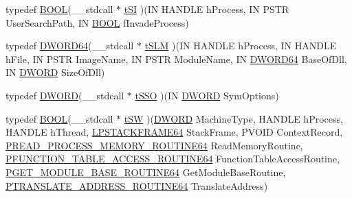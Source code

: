 \begin{DoxyCompactItemize}
\item 
typedef \hyperlink{class_stack_walker_internal_a1fc4c47aaad5ff92853793d0ef3146cd}{B\-O\-O\-L}(\-\_\-\-\_\-stdcall $\ast$ \hyperlink{class_stack_walker_internal_adc383ff1fa52e09c460c0ba4b8ba9a3b}{t\-S\-I} )(I\-N H\-A\-N\-D\-L\-E h\-Process, I\-N P\-S\-T\-R User\-Search\-Path, I\-N \hyperlink{class_stack_walker_internal_a1fc4c47aaad5ff92853793d0ef3146cd}{B\-O\-O\-L} f\-Invade\-Process)
\item 
typedef \hyperlink{_stack_walker_8h_a97fb241c597b99bcb965858f53cacac4}{D\-W\-O\-R\-D64}(\-\_\-\-\_\-stdcall $\ast$ \hyperlink{class_stack_walker_internal_a151d0d6060e9fbca922bbcf86502b466}{t\-S\-L\-M} )(I\-N H\-A\-N\-D\-L\-E h\-Process, I\-N H\-A\-N\-D\-L\-E h\-File, I\-N P\-S\-T\-R Image\-Name, I\-N P\-S\-T\-R Module\-Name, I\-N \hyperlink{_stack_walker_8h_a97fb241c597b99bcb965858f53cacac4}{D\-W\-O\-R\-D64} Base\-Of\-Dll, I\-N \hyperlink{class_stack_walker_internal_aa02cf07e5926c7dd20d31269185c52b0}{D\-W\-O\-R\-D} Size\-Of\-Dll)
\item 
typedef \hyperlink{class_stack_walker_internal_aa02cf07e5926c7dd20d31269185c52b0}{D\-W\-O\-R\-D}(\-\_\-\-\_\-stdcall $\ast$ \hyperlink{class_stack_walker_internal_ad5e78468cabdf8dea0f3b5bf02e23498}{t\-S\-S\-O} )(I\-N \hyperlink{class_stack_walker_internal_aa02cf07e5926c7dd20d31269185c52b0}{D\-W\-O\-R\-D} Sym\-Options)
\item 
typedef \hyperlink{class_stack_walker_internal_a1fc4c47aaad5ff92853793d0ef3146cd}{B\-O\-O\-L}(\-\_\-\-\_\-stdcall $\ast$ \hyperlink{class_stack_walker_internal_a23455d3c1a4ebe202187adca43bab297}{t\-S\-W} )(\hyperlink{class_stack_walker_internal_aa02cf07e5926c7dd20d31269185c52b0}{D\-W\-O\-R\-D} Machine\-Type, H\-A\-N\-D\-L\-E h\-Process, H\-A\-N\-D\-L\-E h\-Thread, \hyperlink{_stack_walker_8cpp_a1645fb6e1f8e09b5a9eac1b9d5cddaca}{L\-P\-S\-T\-A\-C\-K\-F\-R\-A\-M\-E64} Stack\-Frame, P\-V\-O\-I\-D Context\-Record, \hyperlink{_stack_walker_8cpp_a8d21bc6f316637942af2918298f765bd}{P\-R\-E\-A\-D\-\_\-\-P\-R\-O\-C\-E\-S\-S\-\_\-\-M\-E\-M\-O\-R\-Y\-\_\-\-R\-O\-U\-T\-I\-N\-E64} Read\-Memory\-Routine, \hyperlink{_stack_walker_8cpp_abb96de57bd95202c410dda2bb7909fe1}{P\-F\-U\-N\-C\-T\-I\-O\-N\-\_\-\-T\-A\-B\-L\-E\-\_\-\-A\-C\-C\-E\-S\-S\-\_\-\-R\-O\-U\-T\-I\-N\-E64} Function\-Table\-Access\-Routine, \hyperlink{_stack_walker_8cpp_aa650fcfe6749c5a800ddc172b9424d9a}{P\-G\-E\-T\-\_\-\-M\-O\-D\-U\-L\-E\-\_\-\-B\-A\-S\-E\-\_\-\-R\-O\-U\-T\-I\-N\-E64} Get\-Module\-Base\-Routine, \hyperlink{_stack_walker_8cpp_aa4565ac0aa3072ad7372d9531daa23de}{P\-T\-R\-A\-N\-S\-L\-A\-T\-E\-\_\-\-A\-D\-D\-R\-E\-S\-S\-\_\-\-R\-O\-U\-T\-I\-N\-E64} Translate\-Address)

\end{DoxyCompactItemize}
